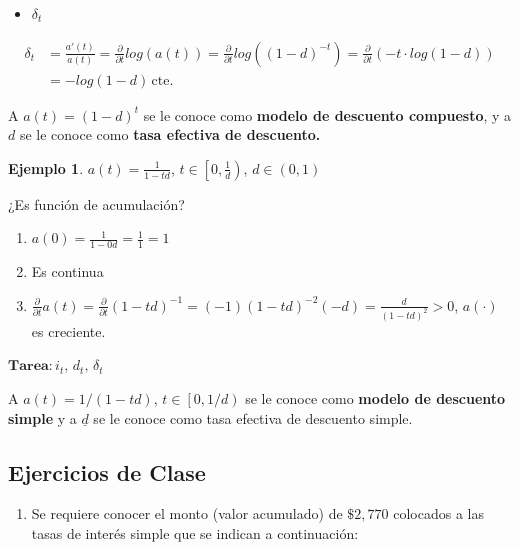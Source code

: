 \documentclass[
]{book}
\providecommand{\tightlist}{%
  \setlength{\itemsep}{0pt}\setlength{\parskip}{0pt}}
\theoremstyle{definition}
\theoremstyle{definition}
\newtheorem{example}{Ejemplo}[chapter]
\theoremstyle{definition}
\theoremstyle{definition}
\theoremstyle{remark}
\begin{document}
\begin{itemize}
\tightlist
\item
  \(\delta_t\)
\end{itemize}

\begin{align*}
\delta_t &= \frac{a'(t)}{a(t)} = \frac{\partial}{\partial t} log(a(t)) = \frac{\partial}{\partial t} log\left( (1-d)^{-t}\right) = \frac{\partial}{\partial t} (-t\cdot log(1-d))\\
& = \boxed{-log(1-d)  \, \text{cte.}}
\end{align*}

A \(\boxed{a(t) = (1-d)^t}\) se le conoce como \textbf{{modelo de descuento compuesto}}, y a \textbf{\(d\)} se le conoce como \textbf{{tasa efectiva de descuento.}}

\begin{example}

\(a(t) = \frac{1}{1-td}\), \(t\in \left[0, \frac{1}{d} \right)\), \(d\in (0,1)\)

¿Es función de acumulación?

\begin{enumerate}
\def\labelenumi{\roman{enumi})}
\item
  \(a(0) = \frac{1}{1-0d} = \frac{1}{1} = 1\)
\item
  Es continua
\item
  \(\frac{\partial}{\partial t} a(t) = \frac{\partial}{\partial t} (1 - td)^{-1} = (-1)(1-td)^{-2}(-d) = \frac{d}{(1-td)^2} > 0\), \(a(\cdot)\) es creciente.
\end{enumerate}

\end{example}

\(\textbf{Tarea:} \, i_t, \, d_t, \, \delta_t\)

A \(\boxed{a(t) = 1/(1-td)}\), \(t\in \left[0,1/d \right)\) se le conoce como \textbf{{modelo de descuento simple}} y a \(\underline{d}\) se le conoce como {tasa efectiva de descuento simple}.

\hypertarget{ejercicios-de-clase}{%
\subsection{Ejercicios de Clase}\label{ejercicios-de-clase}}

\begin{enumerate}
\def\labelenumi{\arabic{enumi}.}
\tightlist
\item
  Se requiere conocer el monto (valor acumulado) de \(\$2,770\) colocados a las tasas de interés simple que se indican a continuación:
\end{enumerate}
\end{document}
